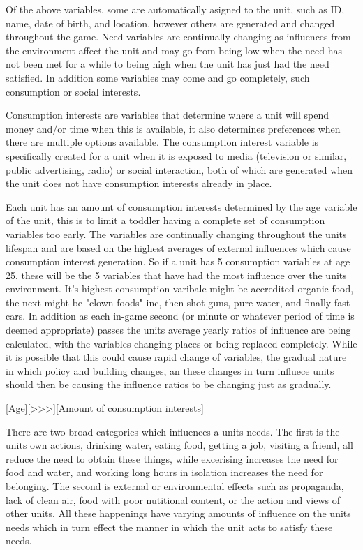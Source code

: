 	

Of the above variables, some are automatically asigned to the unit, such as ID, name, date of birth, and location, however others are generated and changed throughout the game. Need variables are continually changing as influences from the environment affect the unit and may go from being low when the need has not been met for a while to being high when the unit has just had the need satisfied. In addition some variables may come and go completely, such consumption or social interests. 

Consumption interests are variables that determine where a unit will spend money and/or time when this is available, it also determines preferences when there are multiple options available. The consumption interest variable is specifically created for a unit when it is exposed to media (television or similar, public advertising, radio) or social interaction, both of which are generated when the unit does not have consumption interests already in place. 

Each unit has an amount of consumption interests determined by the age variable of the unit, this is to limit a toddler having a complete set of consumption variables too early. The variables are continually changing throughout the units lifespan and are based on the highest averages of external influences which cause consumption interest generation. So if a unit has 5 consumption variables at age 25, these will be the 5 variables that have had the most influence over the units environment. It's highest consumption varibale might be accredited organic food, the next might be "clown foods" inc, then shot guns, pure water, and finally fast cars. In addition as each in-game second (or minute or whatever period of time is deemed appropriate) passes the units average yearly ratios of influence are being calculated, with the variables changing places or being replaced completely. While it is possible that this could cause rapid change of variables, the gradual nature in which policy and building changes, an these changes in turn influece units should then be causing the influence ratios to be changing just as gradually.   


[Age][>>>][Amount of consumption interests] 




There are two broad categories which influences a units needs. The first is the units own actions, drinking water, eating food, getting a job, visiting a friend, all reduce the need to obtain these things, while excerising increases the need for food and water, and working long hours in isolation increases the need for belonging. The second is external or environmental effects such as propaganda, lack of clean air, food with poor nutitional content, or the action and views of other units. All these happenings have varying amounts of influence on the units needs which in turn effect the manner in which the unit acts to satisfy these needs.

